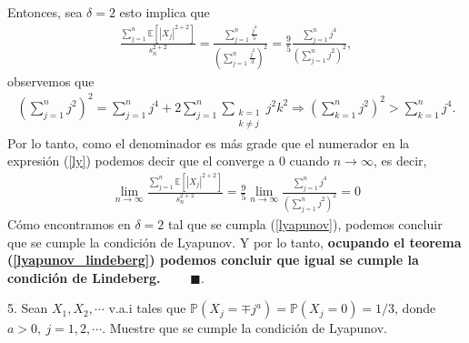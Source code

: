 \documentclass[11pt,letterpaper]{article}
\newcommand{\mP}{\mathbb{P}}
\newcommand{\mE}{\mathbb{E}}
\newcommand{\fin}{$\blacksquare.$}
\begin{document}
Entonces, sea $\delta = 2$ esto implica que 
\begin{align}\label{ly}
\frac{\sum_{j=1}^n\mE\left[|X_j|^{2+2} \right]}{s_n^{2+2}}=\frac{\sum_{j=1}^n \frac{j^{4}}{5}}{\left(\sum_{j=1}^n \frac{j^2}{3}\right)^2}=\frac{9}{5} \frac{\sum_{j=1}^n j^{4}}{\left(\sum_{j=1}^nj^2\right)^2},
\end{align}
observemos que 
\begin{align*}
\left(\sum_{j=1}^nj^2\right)^2=\sum_{j=1}^nj^4+2\sum_{j=1}^n\sum_{\substack{k=1 \\ k\neq j }} j^2k^2\Rightarrow \left(\sum_{k=1}^nj^2\right)^2>\sum_{k=1}^nj^4.
\end{align*}
Por lo tanto, como el denominador es más grade que el numerador en la expresión (\ref{ly}) podemos decir que el converge a 0 cuando $n\rightarrow \infty$, es decir,
\begin{align}
\lim_{n\rightarrow \infty} \frac{\sum_{j=1}^n\mE\left[|X_j|^{2+2} \right]}{s_n^{2+2}}=\frac{9}{5} \lim_{n\rightarrow \infty}\frac{\sum_{j=1}^n j^{4}}{\left(\sum_{j=1}^nj^2\right)^2}= 0
\end{align}
Cómo encontramos en $\delta=2$ tal que se cumpla (\ref{lyapunov}), podemos concluir que se cumple la condición de Lyapunov. Y por lo tanto, \textbf{ocupando el teorema (\ref{lyapunov_lindeberg}) podemos concluir que igual se cumple la condición de Lindeberg. }\ \ \ \ \fin

5. Sean $X_1, X_2, \cdots $ v.a.i tales que $\mP(X_j=\mp j^a)=\mP(X_j=0)=1/3$, donde $a>0, \ j=1,2,\cdots $. Muestre que se cumple la condición de Lyapunov.
\end{document}
